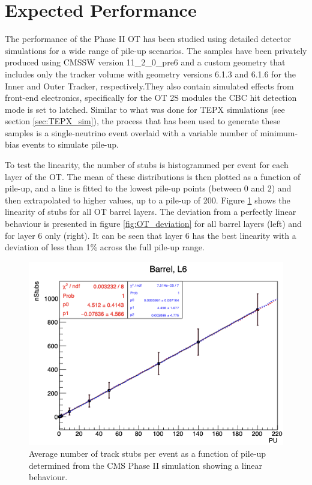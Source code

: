 \section{Expected Performance}

The performance of the Phase II OT has been studied using detailed detector simulations for a wide range of pile-up scenarios. The samples have been privately produced using CMSSW version 11\_2\_0\_pre6 and a custom geometry that includes only the tracker volume with geometry versions 6.1.3 and 6.1.6 for the Inner and Outer Tracker, respectively.They also contain simulated effects from front-end electronics, specifically for the OT 2S modules the CBC hit detection mode is set to latched. Similar to what was done for TEPX simulations (see section \ref{sec:TEPX_sim}), the process that has been used to generate these samples is a single-neutrino event overlaid with a variable number of minimum-bias events to simulate pile-up. 

To test the linearity, the number of stubs is histogrammed per event for each layer of the OT. The mean of these distributions is then plotted as a function of pile-up, and a line is fitted to the lowest pile-up points (between 0 and 2) and then extrapolated to higher values, up to a pile-up of 200. Figure \ref{fig:OT_linearity} shows the linearity of stubs for all OT barrel layers. The deviation from a perfectly linear behaviour is presented in figure \ref{fig:OT_deviation} for all barrel layers (left) and for layer 6 only (right). It can be seen that layer 6 has the best linearity with a deviation of less than 1\% across the full pile-up range.

\begin{figure}[h!]
\centering
\includegraphics[width=.6\linewidth]{tex/Part2/fig/OT/OT-linearity.png}
\caption{
 Average number of track stubs per event as a function of pile-up determined from the CMS Phase II simulation showing a linear behaviour.
} 
\label{fig:OT_linearity}
\end{figure}

